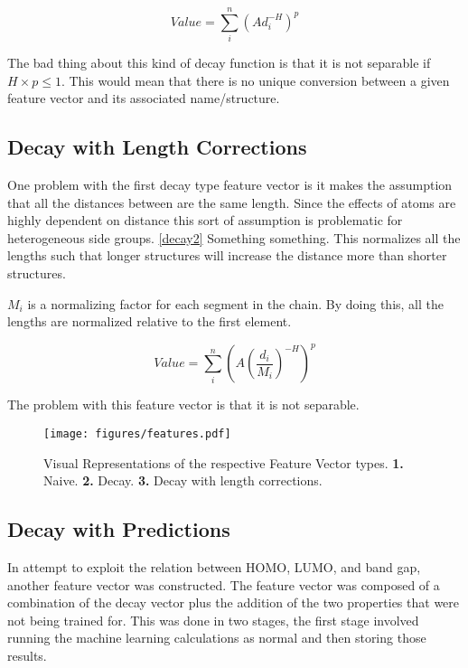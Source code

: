 \documentclass[10pt]{article}
\begin{document}
\begin{equation}\label{decay}
    Value = \sum_i^n (A d_i^{-H})^{p}
\end{equation}

The bad thing about this kind of decay function is that it is not separable if $H \times p \le 1$. This would mean that there is no unique conversion between a given feature vector and its associated name/structure.


\subsection{Decay with Length Corrections}

One problem with the first decay type feature vector is it makes the assumption that all the distances between are the same length. Since the effects of atoms are highly dependent on distance this sort of assumption is problematic for heterogeneous side groups. \eqref{decay2} Something something. This normalizes all the lengths such that longer structures will increase the distance more than shorter structures.

$M_i$ is a normalizing factor for each segment in the chain. By doing this, all the lengths are normalized relative to the first element.

\begin{equation}\label{decay2}
    Value = \sum_i^n \left(A \left(\frac{d_i}{M_i}\right)^{-H} \right)^{p}
\end{equation}

The problem with this feature vector is that it is not separable.

\begin{figure}[H]
  \begin{center}
    \texttt{[image: figures/features.pdf]}
  \end{center}
  \caption{Visual Representations of the respective Feature Vector types. \textbf{1.} Naive. \textbf{2.} Decay. \textbf{3.} Decay with length corrections.}
  \label{fig:features}
\end{figure}

\subsection{Decay with Predictions}

In attempt to exploit the relation between HOMO, LUMO, and band gap, another feature vector was constructed. The feature vector was composed of a combination of the decay vector plus the addition of the two properties that were not being trained for. This was done in two stages, the first stage involved running the machine learning calculations as normal and then storing those results.
\end{document}
